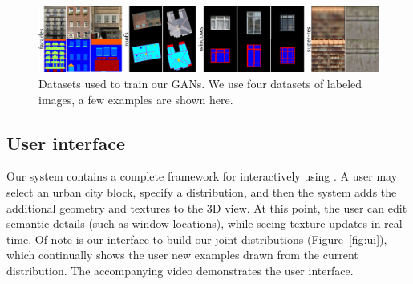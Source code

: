 \begin{figure}[t]
    \centering
    \includegraphics[width=\textwidth]{images/dataset.pdf}
    \caption{Datasets used to train our GANs. We use four datasets of labeled images, a few examples are shown here.}
    \label{fig:dataset}
\end{figure}

\subsection{User interface}

Our system contains a complete framework for interactively using \systemName. A user may select an urban city block, specify a distribution, and then the system adds the additional geometry and textures to the 3D view. At this point, the user can edit semantic details (such as window locations), while seeing texture updates in real time. Of note is our interface to build our joint distributions (Figure~\ref{fig:ui}), which continually shows the user new examples drawn from the current distribution. The accompanying video demonstrates the user interface.

